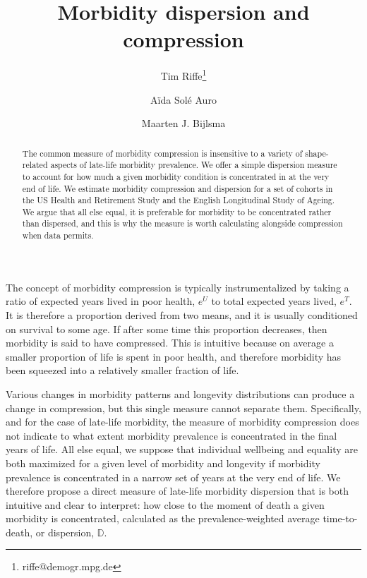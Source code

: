 \documentclass{article}
\begin{document}
\title{Morbidity dispersion and compression}

\author[1]{Tim Riffe\thanks{riffe@demogr.mpg.de}}
\author[2]{A{\"i}da Sol\'{e} Auro}
\author[1]{Maarten J. Bijlsma}

\maketitle

\begin{abstract}
The common measure of morbidity compression is insensitive to a variety of
shape-related aspects of late-life morbidity prevalence. We offer a simple
dispersion measure to account for how much a given morbidity condition is
concentrated in at the very end of life. We estimate morbidity compression and
dispersion for a set of cohorts in the US Health and Retirement Study and the
English Longitudinal Study of Ageing. We argue that all else equal, it is preferable for morbidity to be concentrated rather than dispersed, and this is why the measure is worth calculating alongside compression when data permits.
\end{abstract}

The concept of morbidity compression is typically instrumentalized by taking a
ratio of expected years lived in poor health, $e^U$ to total expected years
lived, $e^T$.
It is therefore a proportion derived from two means, and it is usually conditioned on survival to some age. If after some time this proportion
decreases, then morbidity is said to have compressed. This is intuitive because on average a smaller proportion of life is spent in
poor health, and therefore morbidity has been squeezed into a relatively smaller
fraction of life. 

Various changes in morbidity patterns and longevity
distributions can produce a change in compression, but this single
measure cannot separate them. Specifically, and for the case of late-life morbidity, the measure of
morbidity compression does not indicate to what extent morbidity prevalence is
concentrated in the final years of life. All else equal, we suppose that
individual wellbeing and equality are both maximized for a given level of
morbidity and longevity if morbidity prevalence is concentrated in a narrow set of years at the very end of
life.
We therefore propose a direct measure of late-life morbidity dispersion that
is both intuitive and clear to interpret: how close to the moment of death a given morbidity is
concentrated, calculated as the prevalence-weighted average
time-to-death, or dispersion, $\mathbb{D}$.
\end{document}
